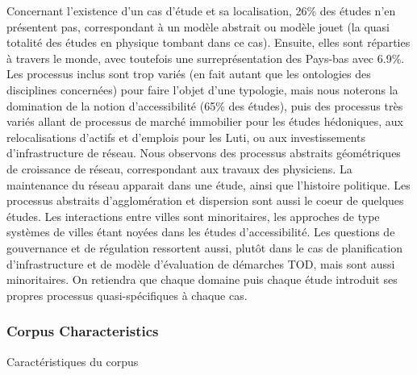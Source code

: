 Concernant l'existence d'un cas d'étude et sa localisation, 26\% des études n'en présentent pas, correspondant à un modèle abstrait ou modèle jouet (la quasi totalité des études en physique tombant dans ce cas). Ensuite, elles sont réparties à travers le monde, avec toutefois une surreprésentation des Pays-bas avec 6.9\%. Les processus inclus sont trop variés (en fait autant que les ontologies des disciplines concernées) pour faire l'objet d'une typologie, mais nous noterons la domination de la notion d'accessibilité (65\% des études), puis des processus très variés allant de processus de marché immobilier pour les études hédoniques, aux relocalisations d'actifs et d'emplois pour les Luti, ou aux investissements d'infrastructure de réseau. Nous observons des processus abstraits géométriques de croissance de réseau, correspondant aux travaux des physiciens. La maintenance du réseau apparait dans une étude, ainsi que l'histoire politique. Les processus abstraits d'agglomération et dispersion sont aussi le coeur de quelques études. Les interactions entre villes sont minoritaires, les approches de type systèmes de villes étant noyées dans les études d'accessibilité. Les questions de gouvernance et de régulation ressortent aussi, plutôt dans le cas de planification d'infrastructure et de modèle d'évaluation de démarches TOD, mais sont aussi minoritaires. On retiendra que chaque domaine puis chaque étude introduit ses propres processus quasi-spécifiques à chaque cas.



\subsubsection{Corpus Characteristics}{Caractéristiques du corpus}

%

